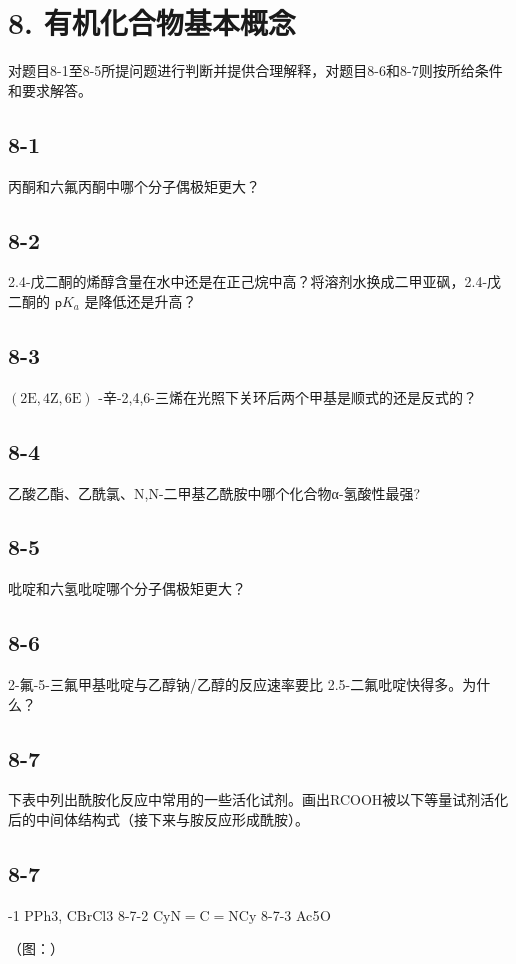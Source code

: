 \section*{8. 有机化合物基本概念}
对题⽬8-1⾄8-5所提问题进⾏判断并提供合理解释，对题⽬8-6和8-7则按所给条件和要求解答。

\subsection*{8-1}
丙酮和六氟丙酮中哪个分⼦偶极矩更⼤？

\subsection*{8-2}
2.4-戊⼆酮的烯醇含量在⽔中还是在正⼰烷中⾼？将溶剂⽔换成⼆甲亚砜，2.4-戊⼆酮的 $\mathsf { p } K _ { a }$ 是降低还是升⾼？

\subsection*{8-3}
$\left( 2 \mathrm { E } , 4 \mathrm { Z } , 6 \mathrm { E } \right)$ -⾟-2,4,6-三烯在光照下关环后两个甲基是顺式的还是反式的？

\subsection*{8-4}
⼄酸⼄酯、⼄酰氯、N,N-⼆甲基⼄酰胺中哪个化合物α-氢酸性最强?

\subsection*{8-5}
吡啶和六氢吡啶哪个分⼦偶极矩更⼤？

\subsection*{8-6}
2-氟-5-三氟甲基吡啶与⼄醇钠/⼄醇的反应速率要⽐ 2.5-⼆氟吡啶快得多。为什么？

\subsection*{8-7}
下表中列出酰胺化反应中常⽤的⼀些活化试剂。画出RCOOH被以下等量试剂活化后的中间体结构式（接下来与胺反应形成酰胺）。

\subsection*{8-7}
-1 PPh3, CBrCl3 8-7-2 $\mathrm { C y N = C = N C y }$ 8-7-3 AcO

（图：）
